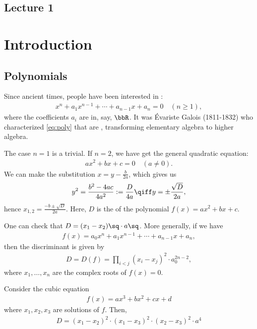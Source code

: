 \documentclass[a4paper]{article}
\begin{document}
\subsection*{Lecture 1} %
\section{Introduction}
\subsection{Polynomials}
Since ancient times, people have been interested in :
\begin{align}
  x^n + a_{1}x^{n-1} + \cdots + a_{n-1}x + a_n = 0\quad (n\geq 1),\label{eq:poly}
\end{align}
where the coefficients $ a_i $ are in, say, $ \bbR $.
It was \'Evariste Galois (1811-1832) who characterized \eqref{eq:poly} that are , transforming elementary algebra to higher algebra.

The case $ n=1 $ is a trivial.
If $ n=2 $, we have get the general quadratic equation:
\begin{align*}
  ax^2+bx+c = 0\quad (a\neq 0).
\end{align*}
We can make the substitution $ x=y-\frac{b}{2a} $, which gives us
\begin{align*}
  y^2 = \frac{b^2-4ac}{4a^2} := \frac{D}{4a} \qiff y=\pm\frac{\sqrt D}{2a},
\end{align*}
hence $ x_{1,2} = \frac{-b\pm \sqrt D}{2a}$.
Here, $ D $ is the  of the polynomial $ f(x) = ax^2+bx+c $.

One can check that $ D = (x_1-x_2)\sq\cdot a\sq $.
More generally, if we have \begin{align*}
  f(x) = a_0x^n+a_{1}x^{n-1}+\cdots+a_{n-1}x+a_n,
\end{align*}
then the discriminant is given by \begin{align*}
  D = D(f) = \prod_{i<j}(x_i-x_j)^2\cdot a_0^{2n-2},
\end{align*}
where $ x_1, \ldots, x_n $ are the complex roots of $ f(x) = 0 $.

\begin{example}
  Consider the cubic equation \begin{align*}
    f(x) = ax^3+bx^2+cx+d
  \end{align*} where $ x_1, x_2, x_3 $ are solutions of $ f $. Then, \begin{align*}
    D = (x_1-x_2)^2\cdot(x_1-x_3)^2\cdot(x_2-x_3)^2 \cdot a^4
  \end{align*}
\end{example}
\end{document}
